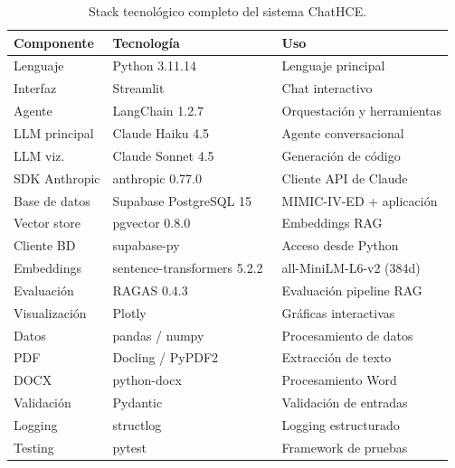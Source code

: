 \begin{table}[H]
\centering
\caption{Stack tecnológico completo del sistema ChatHCE.}
\label{tab:appendix_stack}
\scriptsize
\begin{tabularx}{\columnwidth}{l>{\raggedright\arraybackslash}p{4.5cm}X}
\toprule
\textbf{Componente} & \textbf{Tecnología} & \textbf{Uso} \\
\midrule
Lenguaje & Python 3.11.14 & Lenguaje principal \\
Interfaz & Streamlit~\parencite{streamlit2019} & Chat interactivo \\
Agente & LangChain 1.2.7~\parencite{chase2022langchain} & Orquestación y herramientas \\
\ac{LLM} principal & Claude Haiku 4.5 & Agente conversacional \\
\ac{LLM} viz. & Claude Sonnet 4.5 & Generación de código \\
SDK Anthropic & anthropic 0.77.0 & Cliente \ac{API} de Claude \\
Base de datos & Supabase PostgreSQL 15~\parencite{supabase2020,postgresql2024} & \acs{MIMIC}-IV-\acs{ED} + aplicación \\
Vector store & pgvector 0.8.0~\parencite{pgvector2024} & Embeddings \ac{RAG} \\
Cliente BD & supabase-py & Acceso desde Python \\
Embeddings & sentence-transformers 5.2.2~\parencite{reimers2019sentencebert} & all-MiniLM-L6-v2 (384d) \\
Evaluación & \ac{RAGAS} 0.4.3 & Evaluación pipeline \ac{RAG} \\
Visualización & Plotly~\parencite{plotly2015} & Gráficas interactivas \\
Datos & pandas / numpy & Procesamiento de datos \\
PDF & Docling / PyPDF2 & Extracción de texto \\
DOCX & python-docx & Procesamiento Word \\
Validación & Pydantic~\parencite{pydantic2023} & Validación de entradas \\
Logging & structlog & Logging estructurado \\
Testing & pytest & Framework de pruebas \\
\bottomrule
\end{tabularx}
\end{table}
